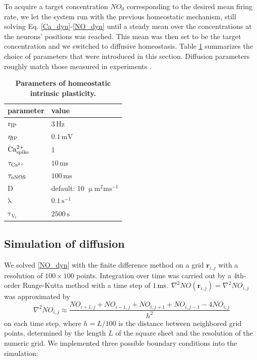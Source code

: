 \documentclass[10pt,letterpaper]{article}
\begin{document}
To acquire a target concentration $NO_0$ corresponding to the desired mean firing rate, we let the system run with the previous homeostatic mechanism, still solving Eq. \eqref{Ca_dyn}-\eqref{NO_dyn} until a steady mean over the concentrations at the neurons' positions was reached. This mean was then set to be the target concentration and we switched to diffusive homeostasis. Table \ref{Params_IP} summarizes the choice of parameters that were introduced in this section. Diffusion parameters roughly match those measured in experiments \cite{Philippides_2000}.
\begin{table}
\caption{\bf Parameters of homeostatic intrinsic plasticity.}
\begin{tabular}{|l|l|}
\hline
\textbf{parameter} & \textbf{value} \\
\hline
$\mathrm{r_{\rm IP}}$ & $\mathrm{3\,Hz}$ \\
\hline
$\mathrm{\eta_{\rm IP}}$ & $\mathrm{0.1\,mV}$ \\
\hline
$\mathrm{Ca^{2+}_{\rm spike}}$ & 1 \\ \hline
$\mathrm{\tau_{\rm Ca^{2+}}}$ &  $\mathrm{10\,ms}$ \\
\hline
$\mathrm{\tau_{\rm nNOS}}$ & $\mathrm{100\,ms}$ \\
\hline
$\mathrm{D}$ & default: 10 $\mathrm{\upmu m^2 ms^{-1}}$ \\
\hline 
$\mathrm{\lambda}$ & $\mathrm{0.1\,s^{-1}}$ \\
\hline
$\mathrm{\tau_{V_t}}$ & $\mathrm{2500\,s}$ \\
\hline
\end{tabular}
\label{Params_IP}
\end{table}

\subsection*{Simulation of diffusion}
We solved \eqref{NO_dyn} with the finite difference method on a grid $\mathbf{r}_{i,j}$ with a resolution of $100\times 100$ points. Integration over time was carried out by a 4th-order Runge-Kutta method with a time step of $\rm 1\, ms$. $\nabla^2 NO(\mathbf{r}_{i,j}) = \nabla^2 NO_{i,j}$ was approximated by
\begin{equation}
\nabla^2 NO_{i,j} \approx \frac{NO_{i+1,j}+NO_{i-1,j}+NO_{i,j+1}+NO_{i,j-1}-4NO_{i,j}}{h^2}
\label{Laplace_Numeric}
\end{equation}
on each time step, where $h = L/100$ is the distance between neighbored grid points, determined by the length $L$ of the square sheet and the resolution of the numeric grid. We implemented three possible boundary conditions into the simulation:
\end{document}
